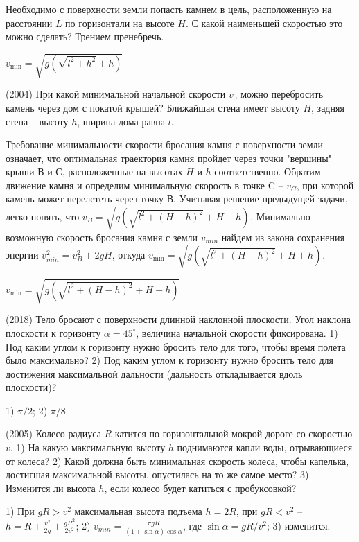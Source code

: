 \begin{ex}
Необходимо с поверхности земли попасть камнем в цель, расположенную на расстоянии $L$ по горизонтали на высоте $H$. С какой наименьшей скоростью это можно сделать? Трением пренебречь.
\begin{ans}
$v_{\min} = \sqrt{g \left(\sqrt{l^2 + h^2} + h \right)}$
\end{ans}
\end{ex}

\begin{ex}
(2004) При какой минимальной начальной скорости $v_0$ можно перебросить камень через дом с покатой крышей? 
Ближайшая стена имеет высоту $H$, задняя стена -- высоту $h$, ширина дома равна $l$.
\begin{center}

\end{center}
\begin{sol}
Требование минимальности скорости бросания камня с поверхности земли означает, что оптимальная траектория камня пройдет через точки "вершины" крыши В и С, расположенные на высотах $H$ и $h$ соответственно. Обратим движение камня и определим минимальную скорость в точке C -- $v_C$, при которой камень может перелететь через точку В. Учитывая решение предыдущей задачи, легко понять, что $v_B = \sqrt{g \left(\sqrt{l^2 + (H-h)^2} + H-h \right)}$. Минимально возможную скорость бросания камня с земли $v_{min}$ найдем из закона сохранения энергии $v_{min}^2 = v_B^2 + 2gH$, откуда $v_{\min} = \sqrt{g \left(\sqrt{l^2 + (H-h)^2} + H + h \right)}$.
\end{sol}
\begin{ans}
$v_{\min} = \sqrt{g \left(\sqrt{l^2 + (H-h)^2} + H + h \right)}$
\end{ans}
\end{ex}

\begin{ex}
(2018) Тело бросают с поверхности длинной наклонной плоскости. Угол наклона плоскости к горизонту $\alpha = 45^{\circ}$, величина начальной скорости фиксирована. 1) Под каким углом к горизонту нужно бросить тело для того, чтобы время полета было максимально? 2) Под каким углом к горизонту нужно бросить тело для достижения максимальной дальности (дальность откладывается вдоль плоскости)?
\begin{ans}
1) $\pi/2$; 2) $\pi/8$
\end{ans}
\end{ex}

\begin{ex}
(2005) Колесо радиуса $R$ катится по горизонтальной мокрой дороге со скоростью $v$. 1) На какую максимальную высоту $h$ поднимаются капли воды, отрывающиеся от колеса? 2) Какой должна быть минимальная скорость колеса, чтобы капелька, достигшая максимальной высоты, опустилась на то же самое место? 3) Изменится ли высота $h$, если колесо будет катиться с пробуксовкой?
\begin{ans}
1) При $gR > v^2$ максимальная высота подъема $h = 2R$, при $gR < v^2$ -- $h = R +\frac{v^2}{2g} + \frac{gR^2}{2v^2}$; 2) $v_{min} = \frac{\pi g R}{(1+ \sin \alpha) \cos \alpha}$, где $\sin \alpha = gR/v^2$; 3) изменится.
\end{ans}
\end{ex}

